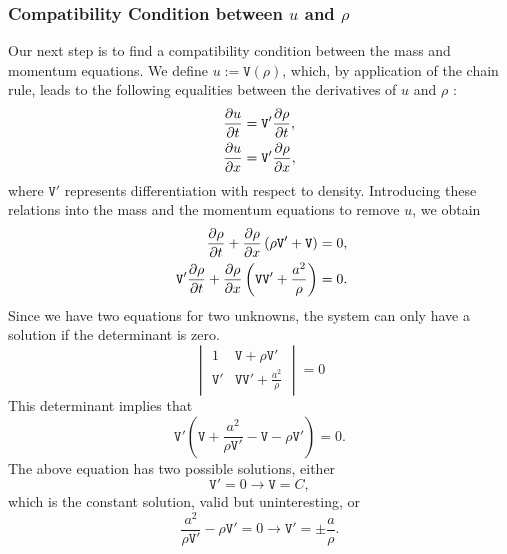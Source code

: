 \documentclass[../../thesis.tex]{subfiles}
\begin{document}
\subsubsection*{Compatibility Condition between $u$ and $\rho$}
Our next step is to find a compatibility condition between the mass and momentum equations.
We define $u:=\mathtt{V}(\rho)$, which, by application of the chain rule, leads to the following equalities between the derivatives of $u$ and $\rho$ :
\begin{subequations}
    \begin{align}
        \pdv{u}{t} &= \mathtt{V}' \pdv{\rho}{t}, \\
        \pdv{u}{x} &= \mathtt{V}' \pdv{\rho}{x},
    \end{align}
\end{subequations}
where $\mathtt{V}'$ represents differentiation with respect to density.
Introducing these relations into the mass and the momentum equations to remove $u$, we obtain
\begin{subequations}
    \begin{align}
            \pdv{\rho}{t} + \pdv{\rho}{x} \left(\rho \mathtt{V}' + \mathtt{V}\right) &= 0, \\ 
            \mathtt{V}' \pdv{\rho}{t} + \pdv{\rho}{x} \left(\mathtt{V} \mathtt{V}' + \frac{a^2}{\rho}\right) &= 0.
    \end{align}
\end{subequations}
Since we have two equations for two unknowns, the system can only have a solution if the determinant is zero.
\begin{equation}
    \begin{vmatrix}
        1 & \mathtt{V} + \rho \mathtt{V}'\\ 
        \mathtt{V}' &  \mathtt{V}\mathtt{V}' + \frac{a^2}{\rho} 
    \end{vmatrix}
    = 0
\end{equation}
This determinant implies that
\begin{equation}
    \mathtt{V}' \left(\mathtt{V} + \frac{a^2}{\rho \mathtt{V}'} - \mathtt{V} - \rho \mathtt{V}'\right) = 0.
\end{equation}
The above equation has two possible solutions, either 
\begin{equation}
    \mathtt{V}'=0 \rightarrow \mathtt{V} = C,
\end{equation} 
which is the constant solution, valid but uninteresting, or 
\begin{equation}
    \frac{a^2}{\rho \mathtt{V}'} - \rho \mathtt{V}' = 0 \rightarrow \mathtt{V}' = \pm \frac{a}{\rho}.
\end{equation}
\end{document}
